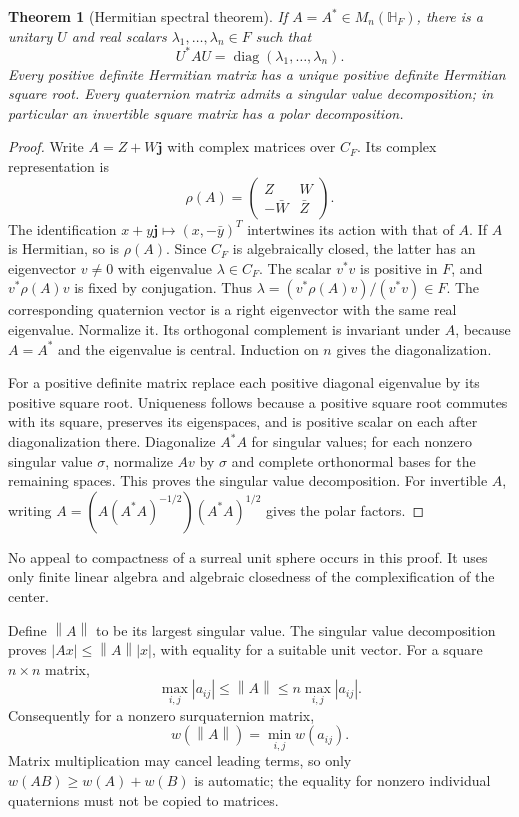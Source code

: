 \documentclass[11pt,letterpaper]{article}
\numberwithin{equation}{section}
\newtheorem{theorem}{Theorem}[section]
\theoremstyle{definition}
\theoremstyle{remark}
\newcommand{\HF}{\mathbb H_F}
\newcommand{\jj}{\mathbf j}
\newcommand{\diag}{\operatorname{diag}}
\newcommand{\norm}[1]{\left\|#1\right\|}
\begin{document}
\begin{theorem}[Hermitian spectral theorem]\label{thm:spectral}
If $A=A^*\in M_n(\HF)$, there is a unitary $U$ and real scalars
$\lambda_1,\ldots,\lambda_n\in F$ such that
\[
 U^*AU=\diag(\lambda_1,\ldots,\lambda_n).
\]
Every positive definite Hermitian matrix has a unique positive definite Hermitian square
root. Every quaternion matrix admits a singular value decomposition; in particular an
invertible square matrix has a polar decomposition.
\end{theorem}
\begin{proof}
Write $A=Z+W\jj$ with complex matrices over $C_F$. Its complex representation is
\[
 \rho(A)=\begin{pmatrix}Z&W\\-\bar W&\bar Z\end{pmatrix}.
\]
The identification $x+y\jj\mapsto(x,-\bar y)^T$ intertwines its action with that of $A$.
If $A$ is Hermitian, so is $\rho(A)$. Since $C_F$ is algebraically closed, the latter has an
eigenvector $v\ne0$ with eigenvalue $\lambda\in C_F$. The scalar $v^*v$ is positive in $F$,
and $v^*\rho(A)v$ is fixed by conjugation. Thus
$\lambda=(v^*\rho(A)v)/(v^*v)\in F$.
The corresponding quaternion vector is a right eigenvector with the same real eigenvalue.
Normalize it. Its orthogonal complement is invariant under $A$, because $A=A^*$ and the
eigenvalue is central. Induction on $n$ gives the diagonalization.

For a positive definite matrix replace each positive diagonal eigenvalue by its positive
square root. Uniqueness follows because a positive square root commutes with its square,
preserves its eigenspaces, and is positive scalar on each after diagonalization there.
Diagonalize $A^*A$ for singular values; for each nonzero singular value $\sigma$, normalize
$Av$ by $\sigma$ and complete orthonormal bases for the remaining spaces. This proves the
singular value decomposition. For invertible $A$, writing
$A=(A(A^*A)^{-1/2})(A^*A)^{1/2}$ gives the polar factors.
\end{proof}

No appeal to compactness of a surreal unit sphere occurs in this proof. It uses only finite
linear algebra and algebraic closedness of the complexification of the center.

Define $\norm A$ to be its largest singular value. The singular value decomposition proves
$|Ax|\le\norm A|x|$, with equality for a suitable unit vector. For a square $n\times n$
matrix,
\begin{equation}\label{eq:matrixnorm}
 \max_{i,j}|a_{ij}|\le\norm A\le n\max_{i,j}|a_{ij}|.
\end{equation}
Consequently for a nonzero surquaternion matrix,
\begin{equation}\label{eq:matrixvaluation}
 w(\norm A)=\min_{i,j}w(a_{ij}).
\end{equation}
Matrix multiplication may cancel leading terms, so only
$w(AB)\ge w(A)+w(B)$ is automatic; the equality for nonzero individual quaternions must
not be copied to matrices.
\end{document}
